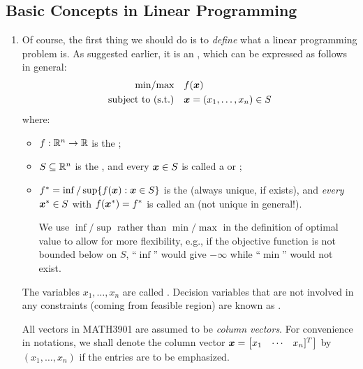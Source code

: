 \subsection{Basic Concepts in Linear Programming}
\label{subsect:lp-basic-cocnepts}
\begin{enumerate}
\item Of course, the first thing we should do is to \emph{define} what a linear
programming problem is. As suggested earlier, it is an , which can be expressed as follows in general:
\begin{align*}
\text{min/max}\quad&f(\bm{x}) \\
\text{subject to (s.t.)}\quad&\bm{x}=(x_1,\dotsc,x_n)\in S
\end{align*}
where:
\begin{itemize}
\item \(f:\mathbb{R}^n\to\mathbb{R}\) is the ;
\item \(S\subseteq \mathbb{R}^n\) is the , and every \(\bm{x}\in S\) is called a  or ;
\item \(f^*=\inf/\sup\{f(\bm{x}):\bm{x}\in S\}\) is the  (always unique, if exists), and \emph{every}
\(\bm{x}^{*}\in S\) with \(f(\bm{x}^{*})=f^{*}\) is called an
 (not unique in general!).
\begin{note}
We use \(\inf/\sup\) rather than \(\min/\max\) in the definition of optimal
value to allow for more flexibility, e.g., if the objective function is not
bounded below on \(S\), ``\(\inf\)'' would give \(-\infty\) while ``\(\min\)''
would not exist.
\end{note}
\end{itemize}
The variables \(x_1,\dotsc,x_n\) are called .
Decision variables that are not involved in any constraints (coming from
feasible region) are known as .

All vectors in MATH3901 are assumed to be \emph{column
vectors}. For convenience in notations, we shall denote the column vector \(\bm{x}=
\begin{bmatrix}x_1&\cdots&x_n]^{T}\end{bmatrix}\) by \((x_1,\dotsc,x_n)\) if
the entries are to be emphasized.


\end{enumerate}
